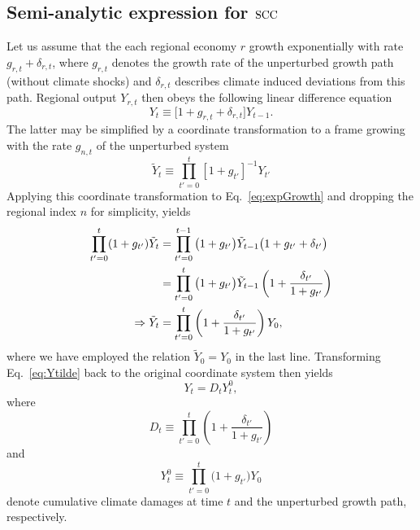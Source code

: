 \documentclass[preprint,3p,authoryear]{elsarticle}
\begin{document}
\subsection{Semi-analytic expression for $\operatorname{SCC}$}
\label{subsec:analytSCC}
Let us assume that the each regional economy $r$ growth exponentially with rate $g_{r,t}+\delta_{r,t}$, where $g_{r,t}$ denotes the growth rate of the unperturbed growth path (without climate shocks) and $\delta_{r,t}$ describes climate induced deviations from this path. Regional output $Y_{r,t}$ then obeys the following linear difference equation
\begin{equation}
  \label{eq:expGrowth}
  Y_t\equiv\big[1+g_{r,t}+\delta_{r,t}\big]Y_{t-1}.
\end{equation}
The latter may be simplified by a coordinate transformation to a frame growing with the rate $g_{n,t}$ of the unperturbed system
\begin{equation}
  \label{eq:growFrame}
  \tilde{Y}_t\equiv\prod_{t'=0}^t\left[1+g_{t'}\right]^{-1}Y_{t'}
\end{equation}
Applying this coordinate transformation to Eq.~\eqref{eq:expGrowth} and dropping the regional index $n$ for simplicity, yields
\begin{align}
\prod_{t'=0}^t(1+g_{t'})\tilde{Y}_t &= \prod_{t'=0}^{t-1}\big(1+g_{t'}\big)\tilde{Y}_{t-1}\big(1+g_{t'}+\delta_{t'}\big)\notag\\                                   &=\prod_{t'=0}^{t}\big(1+g_{t'}\big)\tilde{Y}_{t-1}\left(1+\frac{\delta_{t'}}{1+g_{t'}}\right)\notag\\
  \Rightarrow \tilde{Y}_{t} &= \prod_{t'=0}^{t}\left(1+\frac{\delta_{t'}}{1+g_{t'}}\right)Y_0\label{eq:Ytilde},
\end{align}
where we have employed the relation $\tilde{Y}_0=Y_0$ in the last line. Transforming Eq.~\eqref{eq:Ytilde} back to the original coordinate system then yields
\begin{equation}
  \label{eq:1}
  Y_t=D_tY^0_t,
\end{equation}
where
\begin{equation}
  \label{eq:D}
  D_t\equiv\prod_{t'=0}^{t}\left(1+\frac{\delta_{t'}}{1+g_{t'}}\right)
\end{equation}
and
\begin{equation}
  \label{eq:YNull}
 Y^0_t\equiv\prod_{t'=0}^{t} \big(1+g_{t'}\big)Y_0 
\end{equation}
 denote cumulative climate damages at time $t$ and the unperturbed growth path, respectively.
\end{document}
